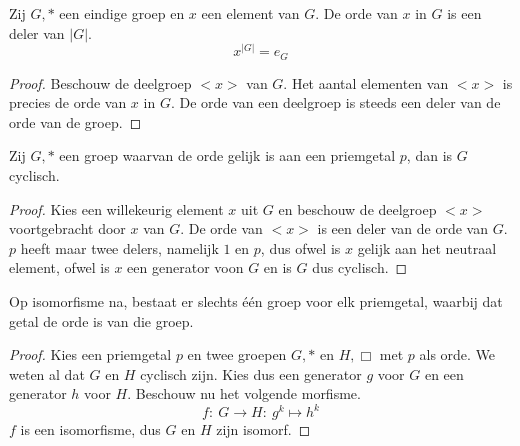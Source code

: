 \documentclass[main.tex]{subfiles}
\begin{document}
\begin{gev}
  \label{gev:orde-van-element-deelt-orde-van-groep}
  Zij $G,*$ een eindige groep en $x$ een element van $G$.
  De orde van $x$ in $G$ is een deler van $|G|$.
  \[ x^{|G|} = e_{G} \]

  \begin{proof}
    Beschouw de deelgroep $<x>$ van $G$.
    Het aantal elementen van $<x>$ is precies de orde van $x$ in $G$.
    De orde van een deelgroep is steeds een deler van de orde van de groep.
  \end{proof}
\end{gev}

\begin{st}
  \label{st:priemgroep-is-cyclisch}
  Zij $G,*$ een groep waarvan de orde gelijk is aan een priemgetal $p$, dan is $G$ cyclisch.
  \begin{proof}
    Kies een willekeurig element $x$ uit $G$ en beschouw de deelgroep $<x>$ voortgebracht door $x$ van $G$.
    De orde van $<x>$ is een deler van de orde van $G$.
    $p$ heeft maar twee delers, namelijk $1$ en $p$, dus ofwel is $x$ gelijk aan het neutraal element, ofwel is $x$ een generator voon $G$ en is $G$ dus cyclisch.
  \end{proof}
\end{st}

\begin{gev}
  Op isomorfisme na, bestaat er slechts \'e\'en groep voor elk priemgetal, waarbij dat getal de orde is van die groep.
  \begin{proof}
    Kies een priemgetal $p$ en twee groepen $G,*$ en $H,\Box$ met $p$ als orde.
    We weten al dat $G$ en $H$ cyclisch zijn.
    Kies dus een generator $g$ voor $G$ en een generator $h$ voor $H$.
    Beschouw nu het volgende morfisme.
    \[ f:\ G \rightarrow H:\ g^{k} \mapsto h^{k} \]
    $f$ is een isomorfisme, dus $G$ en $H$ zijn isomorf.
  \end{proof}
\end{gev}
\end{document}
